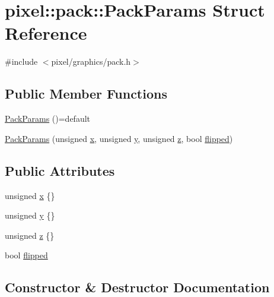 \hypertarget{structpixel_1_1pack_1_1_pack_params}{}\section{pixel\+:\+:pack\+:\+:Pack\+Params Struct Reference}
\label{structpixel_1_1pack_1_1_pack_params}


{\ttfamily \#include $<$pixel/graphics/pack.\+h$>$}

\subsection*{Public Member Functions}
\begin{DoxyCompactItemize}
\item 
\hyperlink{structpixel_1_1pack_1_1_pack_params_a980b508c330947788993092d9f786fb3}{Pack\+Params} ()=default
\item 
\hyperlink{structpixel_1_1pack_1_1_pack_params_ae4c64428986269e6ea9c78c69939a840}{Pack\+Params} (unsigned \hyperlink{structpixel_1_1pack_1_1_pack_params_ad785be2d851bd17b013bd7ac9841e275}{x}, unsigned \hyperlink{structpixel_1_1pack_1_1_pack_params_a7f2d379f827c491805b245777515af21}{y}, unsigned \hyperlink{structpixel_1_1pack_1_1_pack_params_ae77b5bfda6eba8f7b56d80c045d1b8ab}{z}, bool \hyperlink{structpixel_1_1pack_1_1_pack_params_a36e94201bd65095fed383599f2b50ac3}{flipped})
\end{DoxyCompactItemize}
\subsection*{Public Attributes}
\begin{DoxyCompactItemize}
\item 
unsigned \hyperlink{structpixel_1_1pack_1_1_pack_params_ad785be2d851bd17b013bd7ac9841e275}{x} \{\}
\item 
unsigned \hyperlink{structpixel_1_1pack_1_1_pack_params_a7f2d379f827c491805b245777515af21}{y} \{\}
\item 
unsigned \hyperlink{structpixel_1_1pack_1_1_pack_params_ae77b5bfda6eba8f7b56d80c045d1b8ab}{z} \{\}
\item 
bool \hyperlink{structpixel_1_1pack_1_1_pack_params_a36e94201bd65095fed383599f2b50ac3}{flipped}
\end{DoxyCompactItemize}


\subsection{Constructor \& Destructor Documentation}
\mbox{\label{structpixel_1_1pack_1_1_pack_params_a980b508c330947788993092d9f786fb3}} 

